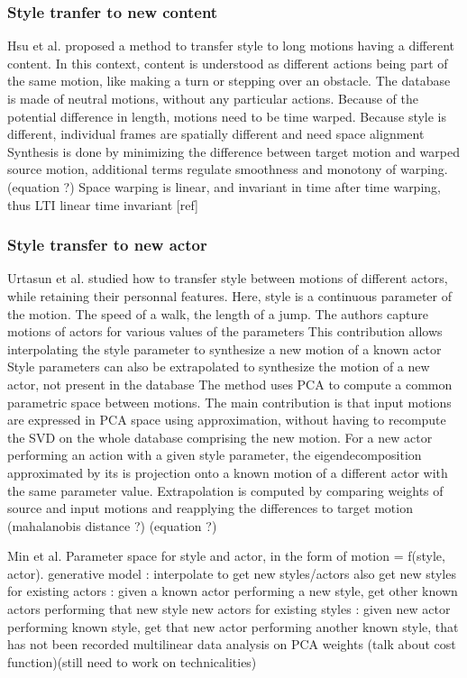 \documentclass[11pt]{sdm_internship}
\begin{document}
{\subsubsection{Style tranfer to new content}

Hsu et al. proposed a method to transfer style to long motions having a different content. In this context, content is understood as different actions being part of the same motion, like making a turn or stepping over an obstacle.
The database is made of neutral motions, without any particular actions.
Because of the potential difference in length, motions need to be time warped. Because style is different, individual frames are spatially different and need space alignment
Synthesis is done by minimizing the difference between target motion and warped source motion, additional terms regulate smoothness and monotony of warping. (equation ?)
Space warping is linear, and invariant in time after time warping, thus LTI linear time invariant [ref]

\subsubsection{Style transfer to new actor}

Urtasun et al. studied how to transfer style between motions of different actors, while retaining their personnal features.
Here, style is a continuous parameter of the motion. The speed of a walk, the length of a jump.
The authors capture motions of actors for various values of the parameters
This contribution allows interpolating the style parameter to synthesize a new motion of a known actor 
Style parameters can also be extrapolated to synthesize the motion of a new actor, not present in the database
The method uses PCA to compute a common parametric space between motions.
The main contribution is that input motions are expressed in PCA space using approximation, without having to recompute the SVD on the whole database comprising the new motion.
For a new actor performing an action with a given style parameter, the eigendecomposition approximated by its is projection onto a known motion of a different actor with the same parameter value.
Extrapolation is computed by comparing weights of source and input motions and reapplying the differences to target motion
(mahalanobis distance ?)
(equation ?)


Min et al. Parameter space for style and actor, in the form of motion = f(style, actor).
generative model : interpolate to get new styles/actors
also get new styles for existing actors : given a known actor performing a new style, get other known actors performing that new style
new actors for existing styles : given new actor performing known style, get that new actor performing another known style, that has not been recorded
multilinear data analysis on PCA weights 
(talk about cost function)(still need to work on technicalities)

}
\end{document}
